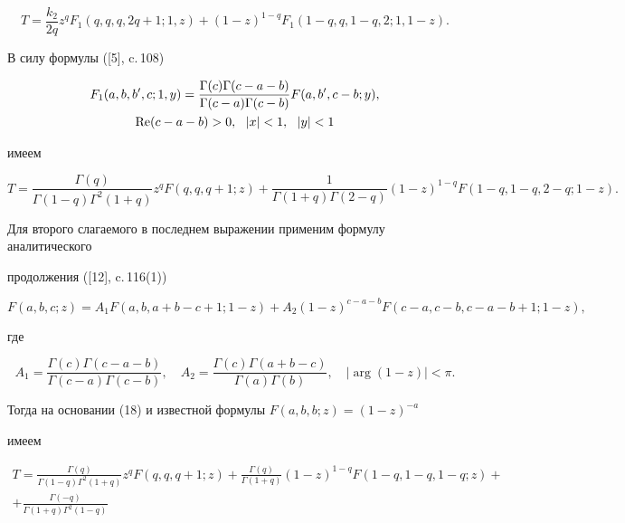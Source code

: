 \begin{pf}
$$


T=\frac{k_2}{2q} z^q F_1(q,q,q,2q+1;1,z)+


(1-z)^{1-q} F_1(1-q,q,1-q,2;1,1-z).


$$


В силу формулы ([5], c.\,108)


\begin{gather*}


F_1(a,b,b',c;1,y)=\frac{\Gamma(c)\Gamma(c-a-b)}{\Gamma(c-a)\Gamma(c-b)}


F(a,b',c-b;y), \\


\re(c-a-b)>0,\ \ |x|<1,\ \ |y|<1


\end{gather*}


имеем


$$


T=\frac{\Gamma(q)}{\Gamma(1-q)\Gamma^2(1+q)}z^q


F(q,q,q+1;z)+\frac{1}{\Gamma(1+q)\Gamma(2-q)} (1-z)^{1-q} 


F(1-q,1-q,2-q;1-z).


$$


Для второго слагаемого в последнем выражении применим формулу аналитического 


продолжения ([12], c.\,116(1))


$$


F(a,b,c;z)=A_1 F(a,b,a+b-c+1;1-z)+


A_2 (1-z)^{c-a-b} F(c-a,c-b,c-a-b+1;1-z),


$$


где


$$


A_1=\frac{\Gamma(c)\Gamma(c-a-b)}{\Gamma(c-a)\Gamma(c-b)},\quad


A_2=\frac{\Gamma(c)\Gamma(a+b-c)}{\Gamma(a)\Gamma(b)},\quad |\arg(1-z)|<\pi.


$$


Тогда на основании (18) и известной формулы $F(a,b,b;z)=(1-z)^{-a}$


имеем


\begin{gather*}


T=\frac{\Gamma(q)}{\Gamma(1-q)\Gamma^2(1+q)} z^q F(q,q,q+1;z)+


\frac{\Gamma(q)}{\Gamma(1+q)} (1-z)^{1-q} F(1-q,1-q,1-q;z)+ \\


%


+\frac{\Gamma(-q)}{\Gamma(1+q)\Gamma^2(1-q)}



\end{gather*}
\end{pf}
